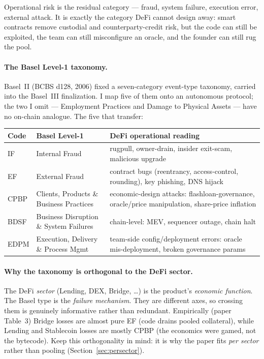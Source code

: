 \documentclass[11pt]{article}
\theoremstyle{definition}
\theoremstyle{remark}
\theoremstyle{definition}
\newcommand{\1}{\mathbf{1}}
\begin{document}
Operational risk is the residual category --- fraud, system failure, execution
error, external attack. It is exactly the category DeFi cannot design away:
smart contracts remove custodial and counterparty-credit risk, but the code can
still be exploited, the team can still misconfigure an oracle, and the founder
can still rug the pool.

\paragraph{The Basel Level-1 taxonomy.}
Basel~II (BCBS d128, 2006) fixed a seven-category event-type taxonomy, carried
into the Basel~III finalization. I map five of them onto an autonomous
protocol; the two I omit --- Employment Practices and Damage to Physical
Assets --- have no on-chain analogue. The five that transfer:

\begin{center}
\small
\begin{tabular}{l L{3.5cm} L{6.6cm}}
\toprule
Code & Basel Level-1 & DeFi operational reading \\
\midrule
IF   & Internal Fraud & rugpull, owner-drain, insider exit-scam, malicious upgrade \\
EF   & External Fraud & contract bugs (reentrancy, access-control, rounding), key phishing, DNS hijack \\
CPBP & Clients, Products \& Business Practices & economic-design attacks: flashloan-governance, oracle/price manipulation, share-price inflation \\
BDSF & Business Disruption \& System Failures & chain-level: MEV, sequencer outage, chain halt \\
EDPM & Execution, Delivery \& Process Mgmt & team-side config/deployment errors: oracle mis-deployment, broken governance params \\
\bottomrule
\end{tabular}
\end{center}

\paragraph{Why the taxonomy is orthogonal to the DeFi sector.}
The DeFi \emph{sector} (Lending, DEX, Bridge, \dots) is the product's
\emph{economic function}. The Basel type is the \emph{failure mechanism}. They
are different axes, so crossing them is genuinely informative rather than
redundant. Empirically (paper Table~3) Bridge losses are almost pure EF (code
drains pooled collateral), while Lending and Stablecoin losses are mostly CPBP
(the economics were gamed, not the bytecode). Keep this orthogonality in mind:
it is why the paper fits \emph{per sector} rather than pooling
(Section~\ref{sec:persector}).
\end{document}
